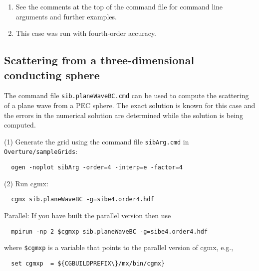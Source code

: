 \documentclass{article}
\begin{document}
\begin{enumerate}
  \item See the comments at the top of the command file for command line arguments and further examples.
  \item This case was run with fourth-order accuracy.
\end{enumerate}




\clearpage
\subsection{Scattering from a three-dimensional conducting sphere} \label{sec:sphere3dScat}

The command file {\tt sib.planeWaveBC.cmd} can be used to compute the scattering
of a plane wave from a PEC sphere. The exact solution is known for this case
and the errors in the numerical solution are determined while the solution
is being computed.


\noindent (1) Generate the grid using the command file {\tt sibArg.cmd} in {\tt Overture/sampleGrids}:
\begin{verbatim}
  ogen -noplot sibArg -order=4 -interp=e -factor=4
\end{verbatim}

\noindent (2) Run cgmx: 
\begin{verbatim}
  cgmx sib.planeWaveBC -g=sibe4.order4.hdf
\end{verbatim}

\noindent Parallel: If you have built the parallel version then use 
\begin{verbatim}
  mpirun -np 2 $cgmxp sib.planeWaveBC -g=sibe4.order4.hdf
\end{verbatim} %
where {\tt \$cgmxp} is a variable that points to the parallel version of cgmx, e.g.,
\begin{verbatim}
  set cgmxp  = ${CGBUILDPREFIX\}/mx/bin/cgmx}
\end{verbatim} %
\end{document}
